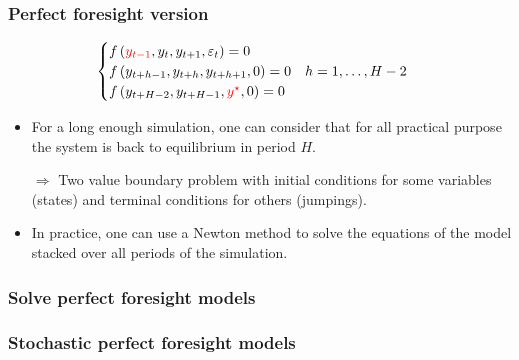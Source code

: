 \documentclass{beamer}
\begin{document}
\begin{frame}
  \frametitle{Perfect foresight version}

  \[
    \begin{cases}
      f\left( {\color{red}y_{t-1}},y_t,y_{t+1},\varepsilon_t \right) = 0\\
      f\left( y_{t+h-1},y_{t+h},y_{t+h+1}, 0 \right) = 0\quad h=1,\ldots,H-2\\
      f\left( y_{t+H-2},y_{t+H-1},{\color{red}y^{\star}}, 0 \right) = 0\\
    \end{cases}
  \]
  \bigskip

  \begin{itemize}

  \item For a long enough simulation, one can consider that for all
    practical purpose the system is back to equilibrium in period $H$.\newline

  \item[$\Rightarrow$] Two value boundary problem with
    initial conditions for some variables (states) and
    terminal conditions for others (jumpings).\newline

  \item In practice, one can use a Newton method to solve the equations of
    the model stacked over all periods of the simulation.\newline

  \end{itemize}

\end{frame}


\begin{frame}
  \frametitle{Solve perfect foresight models}
\end{frame}


\begin{frame}
  \frametitle{Stochastic perfect foresight models}
\end{frame}
\end{document}
